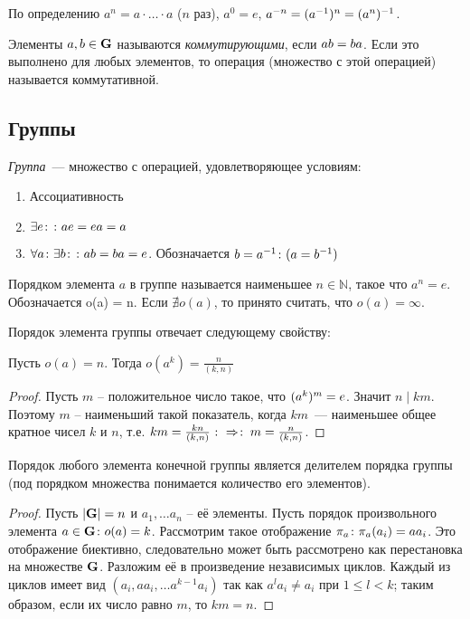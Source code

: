 \begin{df}
  По определению $a^n=a\cdot\dots\cdot a$ ($n$ раз), $a^0=e$, $a^{-n}=(a^{-1})^n\bw=(a^n)^{-1}$.
\end{df}
\begin{df}
  Элементы $a,b\in\mathbf{G}$ называются \emph{коммутирующими}, если $ab\bw=ba$. Если это выполнено для любых элементов, то операция (множество с этой операцией) называется коммутативной.
\end{df}

\subsection{Группы}

\begin{df}
 \emph{Группа}~--- множество с операцией, удовлетворяющее условиям: 
%
 \begin{enumerate}
  \item Ассоциативность
  \item $\exists e\colon\colon ae=ea=a$
  \item $\forall a\colon\exists b\colon\colon ab = ba = e$. Обозначается $b = a^{-1}\colon(a = b^{-1})$
 \end{enumerate}
\end{df}

\begin{df}
Порядком элемента $a$ в группе называется наименьшее $n \in \mathbb N $, такое что $a^n = e$. Обозначается o(a) = n. Если $\nexists o(a)$, то принято считать, что $o(a) = \infty$.
\end{df}

Порядок элемента группы отвечает следующему свойству:

\begin{theorem}
Пусть $o(a)=n$. Тогда $o(a^k)=\frac{n}{(k,n)}$
\end{theorem}
\begin{proof}
  Пусть $m$ -- положительное число такое, что $(a^k)^m\bw=e$. Значит $n\mid km$. Поэтому $m$ -- наименьший такой показатель, когда $km$~--- наименьшее общее кратное чисел $k$ и $n$, т.е. $km=\frac{kn}{(k,n)}\mathbin{\colon\Rightarrow \colon} m=\frac{n}{(k,n)}$.
\end{proof}
 
\begin{theorem}
  \label{group:chaos}
  Порядок любого элемента конечной группы является делителем порядка группы (под порядком множества понимается количество его элементов).
\end{theorem}
\begin{proof}
  Пусть $|\mathbf{G}|=n$ и $a_1,\dots a_n$ -- её элементы. Пусть порядок произвольного элемента $a\in\mathbf{G}\colon o(a)=k$. Рассмотрим такое отображение $\pi_a\colon \pi_a(a_i)\bw=aa_i$. Это отображение биективно, следовательно может быть рассмотрено как перестановка на множестве $\mathbf{G}$. Разложим её в произведение независимых циклов. Каждый из циклов имеет вид $(a_i,aa_i,\dots a^{k-1}a_i)$ так как $a^la_i\ne a_i$ при $1\le l<k$; таким образом, если их число равно $m$, то $km=n$.
\end{proof}


